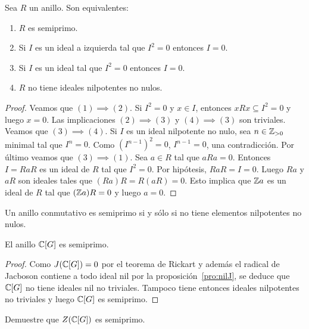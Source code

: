 \begin{lemma}
	Sea $R$ un anillo. Son equivalentes:
	\begin{enumerate}
		\item $R$ es semiprimo.
		\item Si $I$ es un ideal a izquierda tal que $I^2=0$ entonces $I=0$.
		\item Si $I$ es un ideal tal que $I^2=0$ entonces $I=0$.
		\item $R$ no tiene ideales nilpotentes no nulos. 
	\end{enumerate}
\end{lemma}

\begin{proof}
	Veamos que $(1)\implies(2)$. Si $I^2=0$ y $x\in I$, entonces $xRx\subseteq I^2=0$ y
	luego $x=0$. Las implicaciones $(2)\implies(3)$ y $(4)\implies(3)$ son triviales. Veamos que
	$(3)\implies(4)$.  Si $I$ es un ideal nilpotente no nulo, sea $n\in\mathbb{Z}_{>0}$ 
	minimal tal que $I^n=0$.  Como $(I^{n-1})^2=0$, $I^{n-1}=0$, una
	contradicción. Por último veamos que $(3)\implies(1)$. Sea $a\in R$ tal que
	$aRa=0$. Entonces $I=RaR$ es un ideal de $R$ tal que $I^2=0$. Por hipótesis, $RaR=I=0$. Luego
	$Ra$ y $aR$ son ideales tales que $(Ra)R=R(aR)=0$. Esto implica que $\mathbb{Z} a$ es un ideal de $R$
	tal que $(\mathbb{Z} a)R=0$ y luego $a=0$.
\end{proof}

\begin{example}
	Un anillo conmutativo es semiprimo si y sólo si no tiene elementos
	nilpotentes no nulos.
\end{example}


\begin{proposition}
	El anillo $\mathbb{C}[G]$ es semiprimo.
\end{proposition}

\begin{proof}
	Como $J(\mathbb{C}[G])=0$ por el teorema de Rickart y además el radical de Jacboson
	contiene a todo ideal nil por la proposición~\ref{pro:nilJ}, se deduce que
	$\mathbb{C}[G]$ no tiene ideales nil no triviales. Tampoco tiene entonces ideales
	nilpotentes no triviales y luego $\mathbb{C}[G]$ es semiprimo.
\end{proof}

\begin{exercise}
	Demuestre que $Z(\mathbb{C}[G])$ es semiprimo.
\end{exercise}


